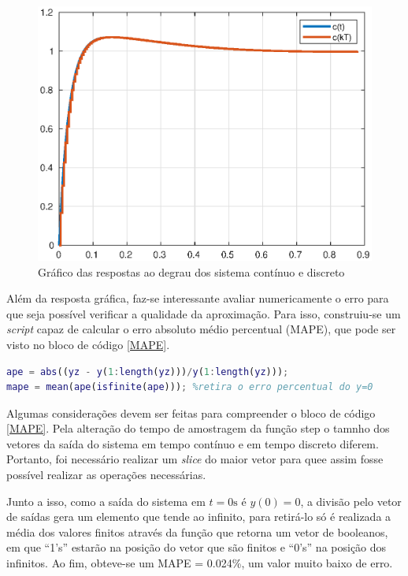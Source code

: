         \begin{figure}[!h]
            \centering
            \includegraphics[width = 0.75\linewidth]{Figuras/ProblemaPID/stepcomp.eps}
            \caption{Gráfico das respostas ao degrau dos sistema contínuo e discreto}
            \label{fig:dcs}                   
        \end{figure}

        Além da resposta gráfica, faz-se interessante avaliar numericamente o erro para que seja 
        possível verificar a qualidade da aproximação. Para isso, construiu-se um \textit{script} 
        capaz de calcular o erro absoluto médio percentual (MAPE), que pode ser visto no 
        bloco de código \ref{MAPE}.     
        \newpage
        \begin{lstlisting}[language=Matlab,label=MAPE,caption=Erro Absoluto Médio Percentual]
ape = abs((yz - y(1:length(yz)))/y(1:length(yz))); 
mape = mean(ape(isfinite(ape))); %retira o erro percentual do y=0
        \end{lstlisting}

        Algumas considerações devem ser feitas para compreender o bloco de código \ref{MAPE}. Pela alteração do tempo de amostragem da função step o tamnho 
        dos vetores da saída do sistema em tempo contínuo e em tempo discreto diferem. Portanto, foi necessário realizar um \textit{slice} do maior vetor
        para quee assim fosse possível realizar as operações necessárias.
        
        Junto a isso, como a saída do sistema em $t=0 \text{s}$ é $y(0) = 0$,
        a divisão pelo vetor de saídas gera um elemento que tende ao infinito, para retirá-lo só é realizada a média dos valores finitos através da função 
         que retorna um vetor de booleanos, em que ``1's'' estarão na posição do vetor que são finitos e ``0's'' na posição dos infinitos.
        Ao fim, obteve-se um MAPE = 0.024\%, um valor muito baixo de erro.



